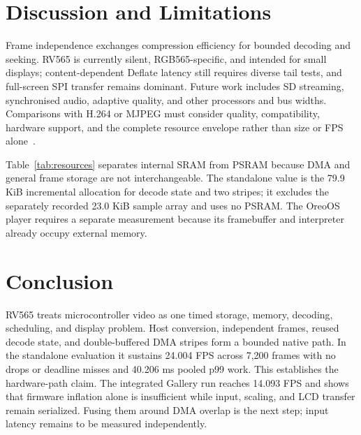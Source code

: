 \documentclass[11pt,twocolumn]{article}
\newcommand{\system}{RV565}
\begin{document}
\section{Discussion and Limitations}

Frame independence exchanges compression efficiency for bounded decoding and
seeking.  RV565 is currently silent, RGB565-specific, and intended for small
displays; content-dependent Deflate latency still requires diverse tail tests,
and full-screen SPI transfer remains dominant.  Future work includes SD
streaming, synchronised audio, adaptive quality, and other processors and bus
widths.  Comparisons with H.264 or MJPEG must consider quality, compatibility,
hardware support, and the complete resource envelope rather than size or FPS
alone~\cite{wiegand2003overview}.

\begin{table}[t]
\centering
\caption{Measured standalone memory use.}
\label{tab:resources}
\end{table}

Table~\ref{tab:resources} separates internal SRAM from PSRAM because DMA and
general frame storage are not interchangeable.  The standalone value is the
79.9 KiB incremental allocation for decode state and two stripes; it excludes
the separately recorded 23.0 KiB sample array and uses no PSRAM.  The OreoOS
player requires a separate measurement because its framebuffer and interpreter
already occupy external memory.

\section{Conclusion}

\system{} treats microcontroller video as one timed storage, memory, decoding,
scheduling, and display problem.  Host conversion, independent frames, reused
decode state, and double-buffered DMA stripes form a bounded native path.  In
the standalone evaluation it sustains 24.004 FPS across 7,200 frames with no
drops or deadline misses and 40.206 ms pooled p99 work.  This establishes the
hardware-path claim.  The integrated Gallery run reaches 14.093 FPS and shows
that firmware inflation alone is insufficient while input, scaling, and LCD
transfer remain serialized.  Fusing them around DMA overlap is the next step;
input latency remains to be measured independently.
\end{document}
